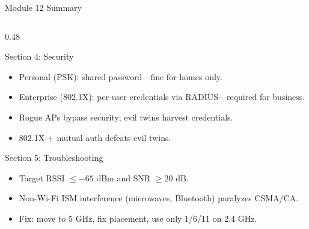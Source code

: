 \documentclass[aspectratio=169]{beamer}
\begin{document}
\begin{frame}[shrink=5]{Module 12 Summary}
\begin{columns}[T]
\begin{column}{0.48\textwidth}
\begin{block}{Section 4: Security}
\begin{itemize}
                    \item Personal (PSK): shared password---fine for homes only.
                    \item Enterprise (802.1X): per-user credentials via RADIUS---required for business.
                    \item Rogue APs bypass security; evil twins harvest credentials.
                    \item 802.1X + mutual auth defeats evil twins.
                \end{itemize}
            \end{block}
            \vspace{0.3em}
            \begin{block}{Section 5: Troubleshooting}
                \scriptsize
                \begin{itemize}
                    \item Target RSSI $\leq -65$ dBm and SNR $\geq 20$ dB.
                    \item Non-Wi-Fi ISM interference (microwaves, Bluetooth) paralyzes CSMA/CA.
                    \item Fix: move to 5 GHz, fix placement, use only 1/6/11 on 2.4 GHz.
                \end{itemize}
            \end{block}
        \end{column}
    \end{columns}
\end{frame}
\end{document}
